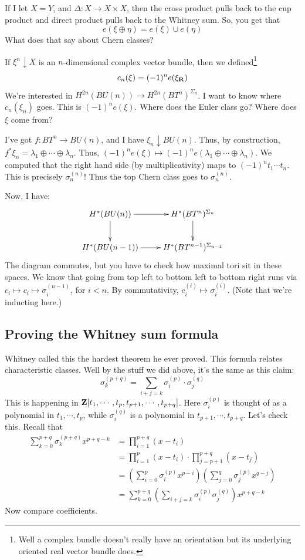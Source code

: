If I let $X=Y$, and $\Delta:X\to X\times X$, then the cross product pulls back to the cup product and direct product pulls back to the Whitney sum.
So, you get that
$$e(\xi\oplus\eta) = e(\xi)\cup e(\eta)$$
What does that say about Chern classes?

If $\xi^n\downarrow X$ is an $n$-dimensional complex vector bundle, then we defined\footnote{Well a complex bundle doesn't really have an orientation but its underlying oriented real vector bundle does.}
$$
c_n(\xi) = (-1)^n e(\xi_\mathbf R)
$$
We're interested in $H^{2n}(BU(n)) \to H^{2n}(BT^n)^{\Sigma_n}$.
I want to know where $c_n(\xi_n)$ goes.
This is $(-1)^ne(\xi)$.
Where does the Euler class go?
Where does $\xi$ come from?

I've got $f:BT^n\to BU(n)$, and I have $\xi_n\downarrow BU(n)$.
Thus, by construction, $f^\ast\xi_n = \lambda_1\oplus\cdots\oplus \lambda_n$.
Thus, $(-1)^ne(\xi)\mapsto (-1)^n e(\lambda_1\oplus\cdots\oplus \lambda_n)$.
We computed that the right hand side (by multiplicativity) maps to $(-1)^nt_1\cdots t_n$.
This is precisely $\sigma_n^{(n)}$!
Thus the top Chern class goes to $\sigma_n^{(n)}$.

Now, I have:
\begin{equation*}
    \xymatrix{
	H^\ast(BU(n)) \ar[r] \ar[d] & H^\ast(BT^n)^{\Sigma_n}\ar[d]\\
	H^\ast(BU(n-1)) \ar[r] & H^\ast(BT^{n-1})^{\Sigma_{n-1}}
    }
\end{equation*}
The diagram commutes, but you have to check how maximal tori sit in these spaces.
We know that going from top left to bottom left to bottom right runs via $c_i\mapsto c_i\mapsto \sigma_i^{(n-1)}$, for $i<n$.
By commutativity, $c_i^{(i)}\mapsto \sigma_i^{(i)}$.
(Note that we're inducting here.)
\subsection{Proving the Whitney sum formula}
Whitney called this the hardest theorem he ever proved.
This formula relates characteristic classes.
Well by the stuff we did above, it's the same as this claim:
$$
\sigma^{(p+q)}_k = \sum_{i+j=k}\sigma_i^{(p)}\cdot\sigma_j^{(q)}
$$
This is happening in $\mathbf Z[t_1,\cdots,t_p,t_{p+1},\cdots,t_{p+q}]$.
Here $\sigma_i^{(p)}$ is thought of as a polynomial in $t_1,\cdots,t_p$, while $\sigma_i^{(q)}$ is a polynomial in $t_{p+1},\cdots,t_{p+q}$.
Let's check this.
Recall that
\begin{align*}
    \sum_{k=0}^{p+q} \sigma_k^{(p+q)}x^{p+q-k} & = \prod^{p+q}_{i=1}(x-t_i)\\
    & = \prod^p_{i=1}(x-t_i)\cdot\prod^{p+q}_{j=p+1}(x-t_j)\\
    & = \left(\sum^p_{i=0}\sigma^{(p)}_i x^{p-i}\right)\left(\sum^q_{j=0}\sigma_j^{(p)} x^{q-j}\right)\\
    & = \sum^{p+q}_{k=0}\left(\sum_{i+j=k}\sigma_i^{(p)}\sigma_j^{(q)}\right)x^{p+q-k}
\end{align*}
Now compare coefficients.
